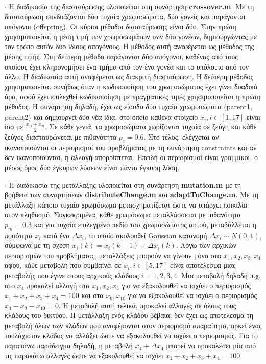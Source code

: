 \documentclass[11pt,a4paper,onecolumn,final]{article}
\begin{document}
{{{\begin{flushleft}
\(\cdot\) Η διαδικασία της διασταύρωσης υλοποιείται στη συνάρτηση \textbf{crossover.m}. Με τη διασταύρωση συνδυάζονται δύο τυχαία χρωμοσώματα, δύο γονείς και παράγονται απόγονοι (offspring). Οι κύριοι μέθοδοι διασταύρωσης είναι δύο. Στην πρώτη χρησιμοποιείται η μέση τιμή των χρωμοσωμάτων των δύο γονέων, δημιουργώντας με τον τρόπο αυτόν δύο ίδιους απογόνους. Η μέθοδος αυτή αναφέρεται ως μέθοδος της μέσης τιμής. Στη δεύτερη μέθοδο παράγονται δύο απόγονοι, καθένας από τους οποίους έχει κληρονομήσει ένα τμήμα από τον ένα γονέα και το υπόλοιπο από τον άλλο. Η διαδικασία αυτή αναφέρεται ως διακριτή διασταύρωση. Η δεύτερη μέθοδος χρησιμοποιείται συνήθως όταν η κωδικοποίηση του χρωμοσώματος έχει γίνει δυαδικά άρα, αφού έχει επιλεχθεί κωδικοποίηση με πραγματικές τιμές χρησιμοποιείται η πρώτη μέθοδος. Η συνάρτηση δηλαδή, έχει ως είσοδο δύο τυχαία χρωμοσώματα (parent1, parent2) και δημιουργεί δύο νέα ίδια, στο οποίο καθένα στοιχείο \(x_{i}, i \in [1, 17] \) είναι ίσο με \(\frac{x_{1i}+x_{2i}}{2}\). Σε κάθε γενιά, τα χρωμοσώματα χωρίζονται τυχαία σε ζεύγη και κάθε ζεύγος διασταυρώνεται με πιθανότητα \(p_{c}=0.6\). Στο τέλος, ελέγχεται αν ικανοποιούνται οι περιορισμοί του προβλήματος με τη συνάρτηση constraints και αν δεν ικανοποιούνται, η αλλαγή απορρίπτεται. Επειδή οι περιορισμοί είναι γραμμικοί, ο μέσος όρος δύο έγκυρων λύσεων είναι πάντα έγκυρη λύση.

\vspace{0.4cm}     

\(\cdot\) Η διαδικασία της μετάλλαξης υλοποιείται στη συνάρτηση \textbf{mutation.m} με τη βοήθεια των συναρτήσεων \textbf{distributeChange.m} και \textbf{adaptToChange.m}. Με τη μετάλλαξη κάποιο τυχαίο χρωμόσωμα μετασχηματίζεται ώστε να υπάρχει ποικιλία στον πληθυσμό. Συγκεκριμένα, κάθε χρωμόσωμα μεταλλάσσεται με πιθανότητα \(p_{m}=0.3\) και για τυχαία επιλεγμένο πεδίο του χρωμοσώματος
αυτού, μεταβάλλεται η ποσότητα \(x_{i}\) κατά ένα \(\Delta x_{i}\), το οποίο ακολουθεί Gaussian κατανομή \(\Delta x_{i} \sim N(0,1)\), σύμφωνα με τη σχέση \(x_{i}(k)=x_{i}(k-1)+\Delta x_{i}(k)\). Λόγω των αρχικών περιορισμών του προβλήματος, μεταλλάξεις μπορούν να γίνουν μόνο στα \(x_{1}, x_{2}, x_{3}, x_{4}\) αφού, κάθε μεταβολή που συμβαίνει σε \(x_{i}, i \in [5, 17]\) είναι αποτέλεσμα μιας μεταβολής που έγινε στους αρχικούς κλάδους \(i = 1, 2, 3, 4\). Μια μεταβολή δηλαδή π.χ. στο \(x_{4}\) προκαλεί αλλαγή στα \(x_{1}, x_{2}, x_{3}\) για να εξακολουθεί να ισχύει ο περιορισμός \(x_{1}+x_{2}+x_{3}+x_{4}=100\) και στα \(x_{9}, x_{10}\) για να εξακολουθεί να ισχύει ο περιορισμός \(x_{4}-x_{9}-x_{10}=0\). Η μεταβολή αυτή τελικά, προκαλεί αλλαγές σε όλους τους κλάδους του δικτύου. Η μετάλλαξη ενός κλάδου βέβαια, δεν έχει ως αποτέλεσμα τη μεταβολή όλων των κλάδων που αναφέρονται στον περιορισμό απαραίτητα, αρκεί ένας τουλάχιστον κλάδος να αλλάξει ώστε να εξακολουθεί να ισχύει ο περιορισμός. Για το παραπάνω παράδειγμα δηλαδή, η μεταβολή \(x_{4}+\Delta x_{4}\) μπορεί να προκαλέσει μία από τις παρακάτω αλλαγές ώστε να εξακολουθεί να ισχύει \(x_{1}+x_{2}+x_{3}+x_{4}=100\) 


\end{flushleft}}}}
\end{document}
